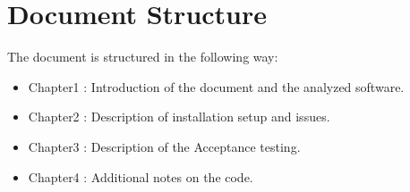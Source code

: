\section{Document Structure}
The document is structured in the following way: 
\begin{itemize}
	\item Chapter1 : Introduction of the document and the analyzed software.
	\item Chapter2 : Description of installation setup and issues.
	\item Chapter3 : Description of the Acceptance testing.
	\item  Chapter4 : Additional notes on the code.
\end{itemize}